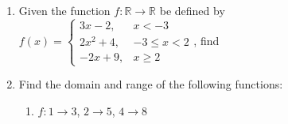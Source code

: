 \documentclass[12pt]{report}
\begin{document}
\begin{enumerate}
    \item Given the function $f: \mathbb{R} \to \mathbb{R}$ be defined by $f(x) = \left\{\begin{array}{rl}
                  3x - 2,   & x < -3        \\
                  2x^2 + 4, & -3 \leq x < 2 \\
                  -2x + 9,  & x \geq 2
              \end{array}\right.$, find
          \begin{enumerate}
          \end{enumerate}

          \newpage
    \item Find the domain and range of the following functions:
          \begin{enumerate}
              \item $f: 1 \to 3$, $2 \to 5$, $4 \to 8$
                    \sol{}


\end{enumerate}
\end{enumerate}
\end{document}
